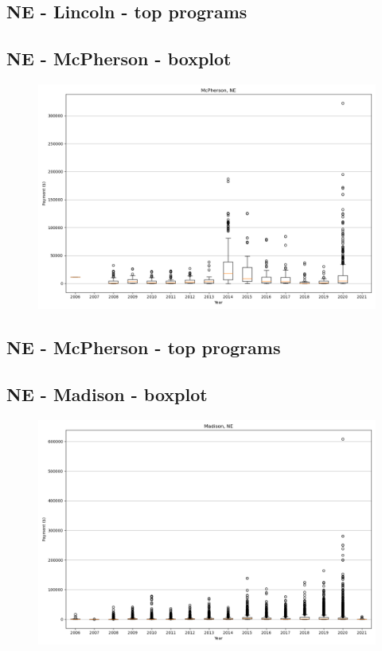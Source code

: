 \subsection*{NE - Lincoln - top programs}

\newpage
\subsection*{NE - McPherson - boxplot}
\begin{figure}[h]
\centering
\includegraphics[width=7in]{../output/boxplots/counties/McPherson-NE_boxplot.png}
\end{figure}


\subsection*{NE - McPherson - top programs}

\newpage
\subsection*{NE - Madison - boxplot}
\begin{figure}[h]
\centering
\includegraphics[width=7in]{../output/boxplots/counties/Madison-NE_boxplot.png}
\end{figure}


